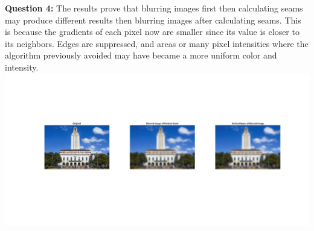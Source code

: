\documentclass[11pt]{article}
\begin{document}
    \textbf{Question 4:}\newline
    The results prove that blurring images first then calculating seams may
    produce different results then blurring images after calculating seams.
    This is because the gradients of each pixel now are smaller since its
    value is closer to its neighbors. Edges are suppressed, and areas or many pixel intensities where the algorithm previously avoided may have
    became a more uniform color and intensity.\newline
    \includegraphics[width=\linewidth]{Part 2 Pictures/question4}\newline
\end{document}
